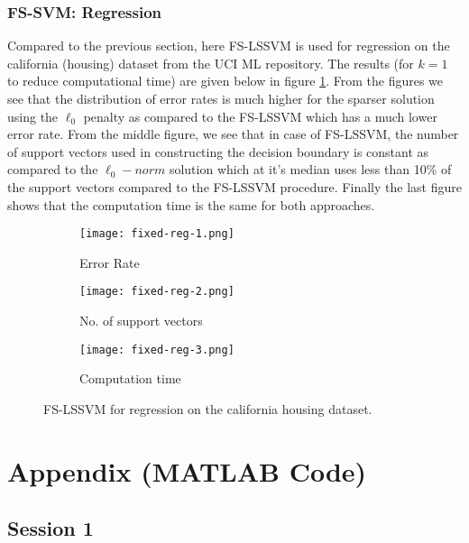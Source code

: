 \documentclass[paper=a4, fontsize=11pt]{scrartcl} %
\numberwithin{equation}{section} %
\begin{document}
\subsubsection{FS-SVM: Regression}

Compared to the previous section, here FS-LSSVM is used for regression on the california (housing) dataset from the UCI ML repository. The results (for $k=1$ to reduce computational time) are given below in figure \ref{fixed-reg}. From the figures we see that the distribution of error rates is much higher for the sparser solution using the $\ell_0$ penalty as compared to the FS-LSSVM which has a much lower error rate. From the middle figure, we see that in case of FS-LSSVM, the number of support vectors used in constructing the decision boundary is constant as compared to the $\ell_0-norm$ solution which at it's median uses less than 10\% of the support vectors compared to the FS-LSSVM procedure. Finally the last figure shows that the computation time is the same for both approaches.

\begin{figure}[H]
\centering
	\begin{subfigure}[b]{0.3\textwidth}
		\centering
		\texttt{[image: fixed-reg-1.png]}
		\caption{Error Rate}
	\end{subfigure}%
	\begin{subfigure}[b]{0.3\textwidth}
		\centering
		\texttt{[image: fixed-reg-2.png]}
		\caption{No. of support vectors}
	\end{subfigure}%
	\begin{subfigure}[b]{0.3\textwidth}
		\centering
		\texttt{[image: fixed-reg-3.png]}
		\caption{Computation time}
	\end{subfigure}
\caption{FS-LSSVM for regression on the california housing dataset.}
\label{fixed-reg}
\end{figure}

\section{Appendix (MATLAB Code)}
\subsection*{Session 1}

\end{document}
